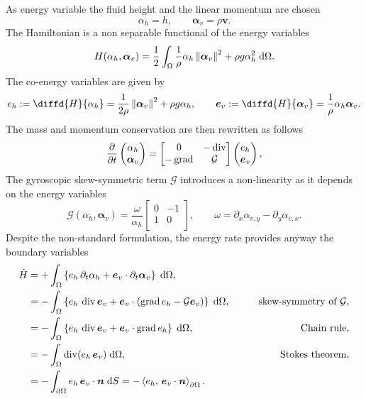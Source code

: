As energy variable the fluid height and the linear momentum are chosen
\begin{equation*}
\alpha_h = h, \qquad \bm{\alpha}_v = \rho \bm{v}.
\end{equation*}
The Hamiltonian is a non separable functional of the energy variables
\begin{equation}\label{eq:H_shwater}
H(\alpha_h, \bm{\alpha}_v) = \frac{1}{2} \int_\Omega \frac{1}{\rho} \alpha_h \norm{\bm{\alpha}_v}^2 + \rho g \alpha_h^2 \d\Omega.
\end{equation}
The co-energy variables are given by
\begin{equation}\label{eq:e_shwater}
e_h := \diffd{H}{\alpha_h} = \frac{1}{2 \rho} \norm{\bm{\alpha}_v}^2 + \rho g \alpha_h, \qquad \bm{e}_v := \diffd{H}{\bm{\alpha}_v} = \frac{1}{\rho} \alpha_h \bm{\alpha}_v.
\end{equation}
The mass and momentum conservation are then rewritten as follows
\begin{equation}\label{eq:pHsys_shwater}
\diffp{}{t}
\begin{pmatrix}
\alpha_h \\
\bm{\alpha}_v \\
\end{pmatrix} = 
\begin{bmatrix}
0 & -\div \\
-\grad & \mathcal{G}
\end{bmatrix}
\begin{pmatrix}
e_h \\
\bm{e}_v \\
\end{pmatrix},
\end{equation}
The gyroscopic skew-symmetric term $\mathcal{G}$ introduces a non-linearity as it depends on the energy variables
\begin{equation*}
\mathcal{G}(\alpha_h, \bm{\alpha}_v) = \frac{\omega}{\alpha_h} \begin{bmatrix}
0 & -1 \\
1 & 0 \\
\end{bmatrix}, \qquad \omega = \partial_x \alpha_{v, y} - \partial_y \alpha_{v, x}.
\end{equation*}
Despite the non-standard formulation, the energy rate provides anyway the boundary variables
\begin{align*}
\dot{H} &= +\int_{\Omega} \left\{ e_h \, \partial_t \alpha_h + \bm{e}_v \cdot \partial_t \bm{\alpha}_v \right\} \d\Omega, \\
&= -\int_{\Omega} \left\{ e_h \, \div \bm{e}_v + \bm{e}_v \cdot (\grad e_h - \mathcal{G} \bm{e}_v) \right\} \d\Omega, \qquad &\text{skew-symmetry of }\mathcal{G}, \\
&= -\int_{\Omega} \left\{e_h \, \div \bm{e}_v + \bm{e}_v \cdot \grad e_h \right\}\d\Omega, \qquad &\text{Chain rule},  \\
&= -\int_{\Omega} \div(e_h \, \bm{e}_v) \d\Omega, \qquad &\text{Stokes theorem}, \\
&= -\int_{\partial \Omega} e_h \, \bm{e}_v\cdot\bm{n} \d{S} = -\inner[\partial\Omega]{e_h}{\bm{e}_v \cdot\bm{n}}.
\end{align*}

